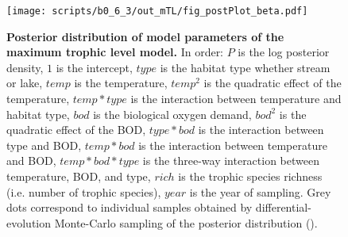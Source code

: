 \documentclass[11pt, oneside]{article}
\begin{document}
\begin{figure}[H]
\begin{center}
\texttt{[image: scripts/b0\_6\_3/out\_mTL/fig\_postPlot\_beta.pdf]}
\caption{
    \textbf{Posterior distribution of model parameters of the maximum trophic level model.}
    In order: $P$ is the log posterior density, $1$ is the intercept, $type$ is the habitat type whether stream or lake, $temp$ is the temperature, $temp^2$ is the quadratic effect of the temperature, $temp * type$ is the interaction between temperature and habitat type, $bod$ is the biological oxygen demand, $bod^2$ is the quadratic effect of the BOD, $type * bod$ is the interaction between type and BOD, $temp * bod$ is the interaction between temperature and BOD, $temp * bod * type$ is the three-way interaction between temperature, BOD, and type, $rich$ is the trophic species richness (i.e. number of trophic species), $year$ is the year of sampling.
    Grey dots correspond to individual samples obtained by differential-evolution Monte-Carlo sampling of the posterior distribution (\cite{TerBraak2006}). 
} 
\end{center}
\end{figure}
\end{document}
